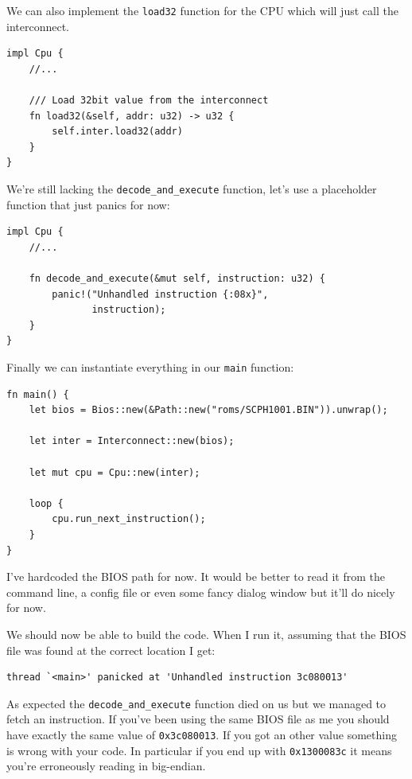 \documentclass[a4paper]{article}
\newcommand{\code}[1] {\texttt{#1}}
\begin{document}
We can also implement the \code{load32} function for the CPU which
will just call the interconnect.

\begin{lstlisting}
impl Cpu {
    //...

    /// Load 32bit value from the interconnect
    fn load32(&self, addr: u32) -> u32 {
        self.inter.load32(addr)
    }
}
\end{lstlisting}

We're still lacking the \code{decode\_and\_execute} function, let's use a
placeholder function that just panics for now:

\begin{lstlisting}
impl Cpu {
    //...

    fn decode_and_execute(&mut self, instruction: u32) {
        panic!("Unhandled instruction {:08x}",
               instruction);
    }
}
\end{lstlisting}

Finally we can instantiate everything in our \code{main} function:

\begin{lstlisting}
fn main() {
    let bios = Bios::new(&Path::new("roms/SCPH1001.BIN")).unwrap();

    let inter = Interconnect::new(bios);

    let mut cpu = Cpu::new(inter);

    loop {
        cpu.run_next_instruction();
    }
}
\end{lstlisting}

I've hardcoded the BIOS path for now. It would be better to read it
from the command line, a config file or even some fancy dialog window
but it'll do nicely for now.

We should now be able to build the code. When I run it, assuming that
the BIOS file was found at the correct location I get:

\begin{verbatim}
thread `<main>' panicked at 'Unhandled instruction 3c080013'
\end{verbatim}

As expected the \code{decode\_and\_execute} function died on us but
we managed to fetch an instruction. If you've been using the same BIOS
file as me you should have exactly the same value of
\code{0x3c080013}. If you got an other value something is wrong with
your code. In particular if you end up with \code{0x1300083c} it
means you're erroneously reading in big-endian.
\end{document}
